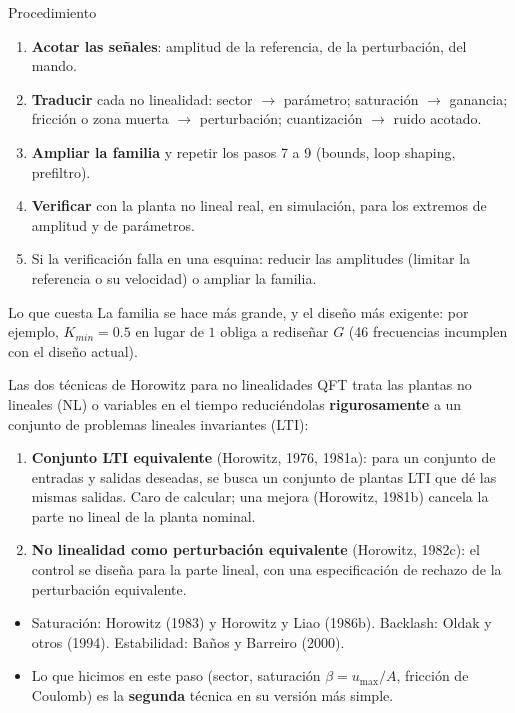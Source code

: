 \documentclass[aspectratio=169,11pt]{beamer}
\begin{document}
\begin{frame}{Procedimiento}
  \small
  \begin{enumerate}
    \item \textbf{Acotar las señales}: amplitud de la referencia, de la perturbación, del mando.
    \item \textbf{Traducir} cada no linealidad: sector $\to$ parámetro; saturación $\to$ ganancia; fricción o zona muerta $\to$ perturbación; cuantización $\to$ ruido acotado.
    \item \textbf{Ampliar la familia} y repetir los pasos 7 a 9 (bounds, loop shaping, prefiltro).
    \item \textbf{Verificar} con la planta no lineal real, en simulación, para los extremos de amplitud y de parámetros.
    \item Si la verificación falla en una esquina: reducir las amplitudes (limitar la referencia o su velocidad) o ampliar la familia.
  \end{enumerate}
  \begin{block}{Lo que cuesta}
    La familia se hace más grande, y el diseño más exigente: por ejemplo, $K_{min}=0.5$ en lugar de $1$ obliga a rediseñar $G$ (46 frecuencias incumplen con el diseño actual).
  \end{block}
\end{frame}

\begin{frame}{Las dos técnicas de Horowitz para no linealidades}
  \small
  QFT trata las plantas no lineales (NL) o variables en el tiempo reduciéndolas \textbf{rigurosamente} a un conjunto de problemas lineales invariantes (LTI):
  \begin{enumerate}
    \item \textbf{Conjunto LTI equivalente} (Horowitz, 1976, 1981a): para un conjunto de entradas y salidas deseadas, se busca un conjunto de plantas LTI que dé las mismas salidas. Caro de calcular; una mejora (Horowitz, 1981b) cancela la parte no lineal de la planta nominal.
    \item \textbf{No linealidad como perturbación equivalente} (Horowitz, 1982c): el control se diseña para la parte lineal, con una especificación de rechazo de la perturbación equivalente.
  \end{enumerate}
  \begin{itemize}
    \item Saturación: Horowitz (1983) y Horowitz y Liao (1986b). Backlash: Oldak y otros (1994). Estabilidad: Baños y Barreiro (2000).
    \item Lo que hicimos en este paso (sector, saturación $\beta=u_{\max}/A$, fricción de Coulomb) es la \textbf{segunda} técnica en su versión más simple.
  \end{itemize}
\end{frame}
\end{document}
